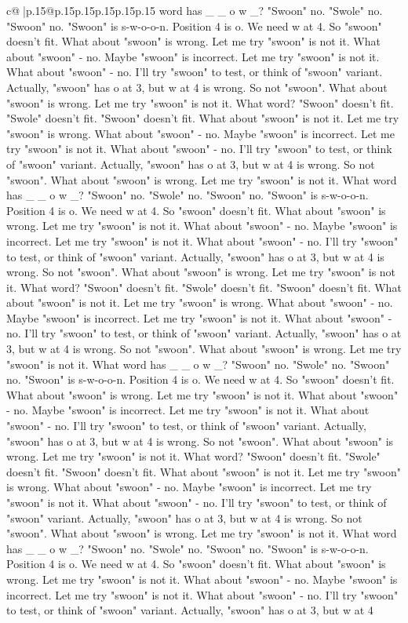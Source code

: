 \documentclass{article}
\begin{document}
{\begin{supertabular}{c@{$\;$}|p{.15\linewidth}@{}p{.15\linewidth}p{.15\linewidth}p{.15\linewidth}p{.15\linewidth}p{.15\linewidth}}
{{{word has \_ \_ o w \_? "Swoon" no. "Swole" no. "Swoon" no. "Swoon" is s{-}w{-}o{-}o{-}n. Position 4 is o. We need w at 4. So "swoon" doesn't fit. What about "swoon" is wrong. Let me try "swoon" is not it. What about "swoon" {-} no. Maybe "swoon" is incorrect. Let me try "swoon" is not it. What about "swoon" {-} no. I'll try "swoon" to test, or think of "swoon" variant. Actually, "swoon" has o at 3, but w at 4 is wrong. So not "swoon". What about "swoon" is wrong. Let me try "swoon" is not it. What word? "Swoon" doesn't fit. "Swole" doesn't fit. "Swoon" doesn't fit. What about "swoon" is not it. Let me try "swoon" is wrong. What about "swoon" {-} no. Maybe "swoon" is incorrect. Let me try "swoon" is not it. What about "swoon" {-} no. I'll try "swoon" to test, or think of "swoon" variant. Actually, "swoon" has o at 3, but w at 4 is wrong. So not "swoon". What about "swoon" is wrong. Let me try "swoon" is not it. What word has \_ \_ o w \_? "Swoon" no. "Swole" no. "Swoon" no. "Swoon" is s{-}w{-}o{-}o{-}n. Position 4 is o. We need w at 4. So "swoon" doesn't fit. What about "swoon" is wrong. Let me try "swoon" is not it. What about "swoon" {-} no. Maybe "swoon" is incorrect. Let me try "swoon" is not it. What about "swoon" {-} no. I'll try "swoon" to test, or think of "swoon" variant. Actually, "swoon" has o at 3, but w at 4 is wrong. So not "swoon". What about "swoon" is wrong. Let me try "swoon" is not it. What word? "Swoon" doesn't fit. "Swole" doesn't fit. "Swoon" doesn't fit. What about "swoon" is not it. Let me try "swoon" is wrong. What about "swoon" {-} no. Maybe "swoon" is incorrect. Let me try "swoon" is not it. What about "swoon" {-} no. I'll try "swoon" to test, or think of "swoon" variant. Actually, "swoon" has o at 3, but w at 4 is wrong. So not "swoon". What about "swoon" is wrong. Let me try "swoon" is not it. What word has \_ \_ o w \_? "Swoon" no. "Swole" no. "Swoon" no. "Swoon" is s{-}w{-}o{-}o{-}n. Position 4 is o. We need w at 4. So "swoon" doesn't fit. What about "swoon" is wrong. Let me try "swoon" is not it. What about "swoon" {-} no. Maybe "swoon" is incorrect. Let me try "swoon" is not it. What about "swoon" {-} no. I'll try "swoon" to test, or think of "swoon" variant. Actually, "swoon" has o at 3, but w at 4 is wrong. So not "swoon". What about "swoon" is wrong. Let me try "swoon" is not it. What word? "Swoon" doesn't fit. "Swole" doesn't fit. "Swoon" doesn't fit. What about "swoon" is not it. Let me try "swoon" is wrong. What about "swoon" {-} no. Maybe "swoon" is incorrect. Let me try "swoon" is not it. What about "swoon" {-} no. I'll try "swoon" to test, or think of "swoon" variant. Actually, "swoon" has o at 3, but w at 4 is wrong. So not "swoon". What about "swoon" is wrong. Let me try "swoon" is not it. What word has \_ \_ o w \_? "Swoon" no. "Swole" no. "Swoon" no. "Swoon" is s{-}w{-}o{-}o{-}n. Position 4 is o. We need w at 4. So "swoon" doesn't fit. What about "swoon" is wrong. Let me try "swoon" is not it. What about "swoon" {-} no. Maybe "swoon" is incorrect. Let me try "swoon" is not it. What about "swoon" {-} no. I'll try "swoon" to test, or think of "swoon" variant. Actually, "swoon" has o at 3, but w at 4 }}}
\end{supertabular}}
\end{document}
